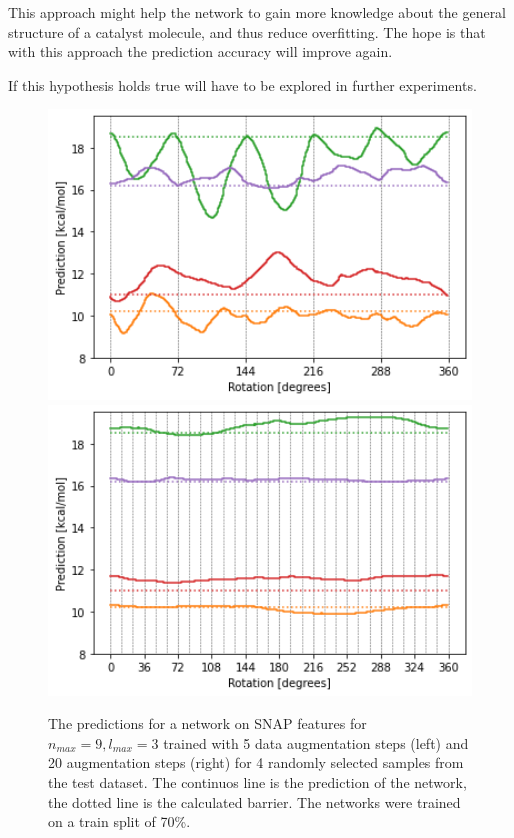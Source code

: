 This approach might help the network to gain more knowledge about the general structure of a catalyst molecule,
and thus reduce overfitting.
The hope is that with this approach the prediction accuracy will improve again.

If this hypothesis holds true will have to be explored in further experiments.


\begin{figure}[!htb]
  \centering
    \includegraphics[width=1.0\textwidth]{figures/regression/snap/aug-5steps-30per.png}
  \endminipage\hfill
  \includegraphics[width=1.0\textwidth]{figures/regression/snap/aug-30steps-30per.png}
  \endminipage\hfill
  \caption[Evaluation of SNAP rotational invariance]{
  The predictions for a network on SNAP features for $n_{max}=9, l_{max}=3$ trained with 5 data augmentation steps (left) 
  and 20 augmentation steps (right) for 4 randomly selected samples from the test dataset.
  The continuos line is the prediction of the network, the dotted line is the calculated barrier.
  The networks were trained on a train split of 70\%.
  }
  \label{fig:snap_roation}

\end{figure}


